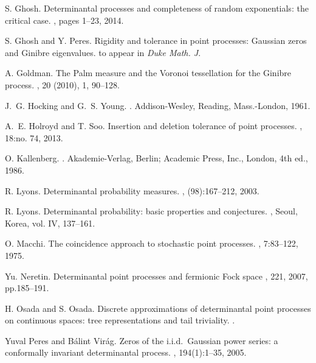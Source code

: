 \documentclass[12pt]{paper}
\numberwithin{theorem}{section}
\numberwithin{figure}{section}
\numberwithin{equation}{section}
\begin{document}
\begin{thebibliography}{10}
S. Ghosh.
\newblock Determinantal processes and completeness of random exponentials: the
  critical case.
, pages 1--23, 2014.


S. Ghosh and Y. Peres.
\newblock Rigidity and tolerance in point processes: {G}aussian zeros and
  {G}inibre eigenvalues.
\newblock to appear in {\em Duke Math. J}.



A. Goldman.
\newblock The {P}alm measure and the {V}oronoi tessellation for the {G}inibre process. 
, 20 (2010), 1, 90--128.


J.~G. Hocking and G.~S. Young.
.
\newblock Addison-Wesley, Reading, Mass.-London, 1961.



A.~E. Holroyd and T. Soo.
\newblock Insertion and deletion tolerance of point processes.
, 18:no. 74, 2013.




O. Kallenberg.
.
\newblock Akademie-Verlag, Berlin; Academic Press, Inc., London, 4th
  ed., 1986.

R. Lyons.
\newblock Determinantal probability measures.
, (98):167--212, 2003.

R. Lyons.
\newblock Determinantal probability: basic properties and conjectures.
, Seoul, Korea, vol. IV, 137--161.


O. Macchi.
\newblock The coincidence approach to stochastic point processes.
, 7:83--122, 1975.

  Yu. Neretin.
\newblock Determinantal point processes and fermionic Fock space
 ,  221, 2007, pp.185--191.



H. Osada and S. Osada.
\newblock Discrete approximations of determinantal point processes on continuous spaces: tree representations and tail triviality.
.


Yuval Peres and B{\'a}lint Vir{\'a}g.
\newblock Zeros of the i.i.d.\ {G}aussian power series: a conformally invariant
  determinantal process.
, 194(1):1--35, 2005.


\end{thebibliography}
\end{document}

